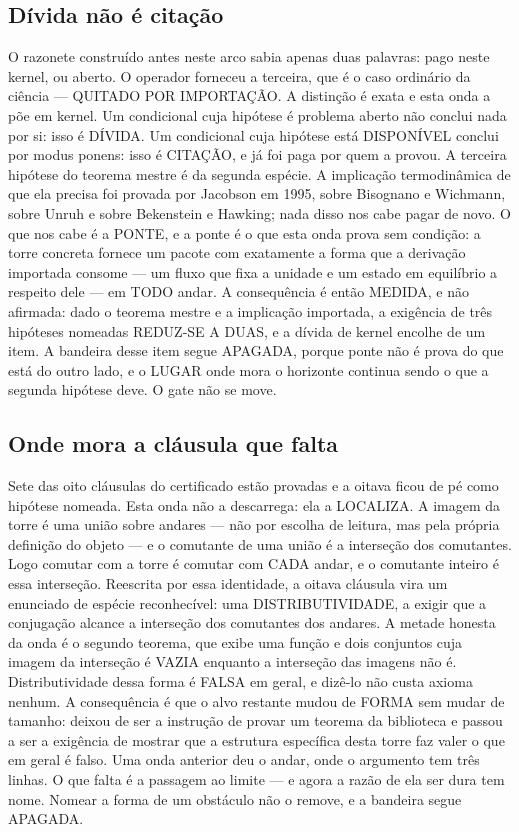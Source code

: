 \documentclass[11pt]{article}
\theoremstyle{definition}\newtheorem{deriv}{Derivação}
\begin{document}
\subsection*{D\'ivida n\~ao \'e cita\c{c}\~ao}O razonete constru\'ido antes neste arco sabia apenas duas palavras: pago neste kernel, ou aberto. O operador forneceu a terceira, que \'e o caso ordin\'ario da ci\^encia --- QUITADO POR IMPORTA\c{C}\~AO. A distin\c{c}\~ao \'e exata e esta onda a p\~oe em kernel. Um condicional cuja hip\'otese \'e problema aberto n\~ao conclui nada por si: isso \'e D\'IVIDA. Um condicional cuja hip\'otese est\'a DISPON\'IVEL conclui por modus ponens: isso \'e CITA\c{C}\~AO, e j\'a foi paga por quem a provou. A terceira hip\'otese do teorema mestre \'e da segunda esp\'ecie. A implica\c{c}\~ao termodin\^amica de que ela precisa foi provada por Jacobson em 1995, sobre Bisognano e Wichmann, sobre Unruh e sobre Bekenstein e Hawking; nada disso nos cabe pagar de novo. O que nos cabe \'e a PONTE, e a ponte \'e o que esta onda prova sem condi\c{c}\~ao: a torre concreta fornece um pacote com exatamente a forma que a deriva\c{c}\~ao importada consome --- um fluxo que fixa a unidade e um estado em equil\'ibrio a respeito dele --- em TODO andar. A consequ\^encia \'e ent\~ao MEDIDA, e n\~ao afirmada: dado o teorema mestre e a implica\c{c}\~ao importada, a exig\^encia de tr\^es hip\'oteses nomeadas REDUZ-SE A DUAS, e a d\'ivida de kernel encolhe de um item. A bandeira desse item segue APAGADA, porque ponte n\~ao \'e prova do que est\'a do outro lado, e o LUGAR onde mora o horizonte continua sendo o que a segunda hip\'otese deve. O gate n\~ao se move.

\subsection*{Onde mora a cl\'ausula que falta}Sete das oito cl\'ausulas do certificado est\~ao provadas e a oitava ficou de p\'e como hip\'otese nomeada. Esta onda n\~ao a descarrega: ela a LOCALIZA. A imagem da torre \'e uma uni\~ao sobre andares --- n\~ao por escolha de leitura, mas pela pr\'opria defini\c{c}\~ao do objeto --- e o comutante de uma uni\~ao \'e a interse\c{c}\~ao dos comutantes. Logo comutar com a torre \'e comutar com CADA andar, e o comutante inteiro \'e essa interse\c{c}\~ao. Reescrita por essa identidade, a oitava cl\'ausula vira um enunciado de esp\'ecie reconhec\'ivel: uma DISTRIBUTIVIDADE, a exigir que a conjuga\c{c}\~ao alcance a interse\c{c}\~ao dos comutantes dos andares. A metade honesta da onda \'e o segundo teorema, que exibe uma fun\c{c}\~ao e dois conjuntos cuja imagem da interse\c{c}\~ao \'e VAZIA enquanto a interse\c{c}\~ao das imagens n\~ao \'e. Distributividade dessa forma \'e FALSA em geral, e diz\^e-lo n\~ao custa axioma nenhum. A consequ\^encia \'e que o alvo restante mudou de FORMA sem mudar de tamanho: deixou de ser a instru\c{c}\~ao de provar um teorema da biblioteca e passou a ser a exig\^encia de mostrar que a estrutura espec\'ifica desta torre faz valer o que em geral \'e falso. Uma onda anterior deu o andar, onde o argumento tem tr\^es linhas. O que falta \'e a passagem ao limite --- e agora a raz\~ao de ela ser dura tem nome. Nomear a forma de um obst\'aculo n\~ao o remove, e a bandeira segue APAGADA.
\end{document}
